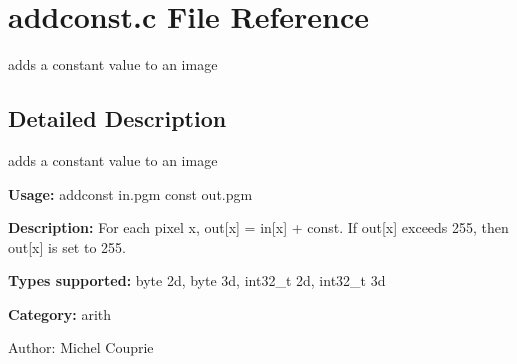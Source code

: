 \section{addconst.c File Reference}
\label{addconst_8c}
adds a constant value to an image  




\label{_details}
\subsection{Detailed Description}
adds a constant value to an image 

{\bf Usage:} addconst in.pgm const out.pgm

{\bf Description:} For each pixel x, out[x] = in[x] + const. If out[x] exceeds 255, then out[x] is set to 255.

{\bf Types supported:} byte 2d, byte 3d, int32\_\-t 2d, int32\_\-t 3d

{\bf Category:} arith

\begin{Desc}
\item[Author:]Michel Couprie \end{Desc}
